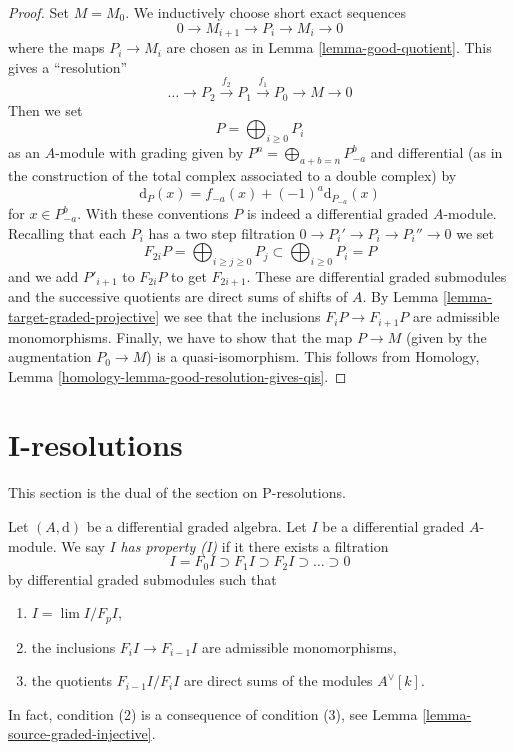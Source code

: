 \begin{proof}
Set $M = M_0$. We inductively choose short exact sequences
$$
0 \to M_{i + 1} \to P_i \to M_i \to 0
$$
where the maps $P_i \to M_i$ are chosen as in Lemma \ref{lemma-good-quotient}.
This gives a ``resolution''
$$
\ldots \to P_2 \xrightarrow{f_2} P_1 \xrightarrow{f_1} P_0 \to M \to 0
$$
Then we set
$$
P = \bigoplus\nolimits_{i \geq 0} P_i
$$
as an $A$-module with grading given by
$P^n = \bigoplus_{a + b = n} P_{-a}^b$ and
differential (as in the construction of the total complex associated
to a double complex) by
$$
\text{d}_P(x) = f_{-a}(x) + (-1)^a \text{d}_{P_{-a}}(x)
$$
for $x \in P_{-a}^b$. With these conventions $P$ is indeed a differential
graded $A$-module. Recalling that each $P_i$ has a two step filtration
$0 \to P_i' \to P_i \to P_i'' \to 0$ we set
$$
F_{2i}P = \bigoplus\nolimits_{i \geq j \geq 0} P_j
\subset
\bigoplus\nolimits_{i \geq 0} P_i = P
$$
and we add $P'_{i + 1}$ to $F_{2i}P$ to get $F_{2i + 1}$.
These are differential graded submodules and the successive quotients
are direct sums of shifts of $A$. By
Lemma \ref{lemma-target-graded-projective} we see that
the inclusions $F_iP \to F_{i + 1}P$ are admissible monomorphisms.
Finally, we have to show that the map $P \to M$ (given by the
augmentation $P_0 \to M$) is a quasi-isomorphism. This follows from
Homology, Lemma \ref{homology-lemma-good-resolution-gives-qis}.
\end{proof}





\section{I-resolutions}
\label{section-I-resolutions}

\noindent
This section is the dual of the section on P-resolutions.

\medskip\noindent
Let $(A, \text{d})$ be a differential graded algebra.
Let $I$ be a differential graded $A$-module. We say $I$
{\it has property (I)} if it there exists a filtration
$$
I = F_0I \supset F_1I \supset F_2I \supset \ldots \supset 0
$$
by differential graded submodules such that
\begin{enumerate}
\item $I = \lim I/F_pI$,
\item the inclusions $F_iI \to F_{i - 1}I$ are admissible
monomorphisms,
\item the quotients $F_{i - 1}I/F_iI$ are direct sums of the
modules $A^\vee[k]$.
\end{enumerate}
In fact, condition (2) is a consequence of condition (3), see
Lemma \ref{lemma-source-graded-injective}.

